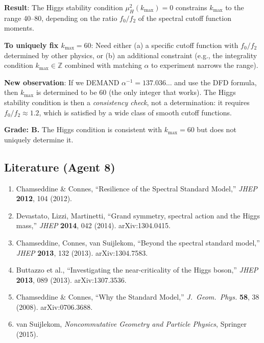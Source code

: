\documentclass[11pt,a4paper]{article}
\begin{document}
\begin{tcolorbox}[colback=yellow!5!white, colframe=yellow!60!black, title={Agent 8: $k_{\max}$ from Higgs Stability}]
\textbf{Result}: The Higgs stability condition $\mu_H^2(k_{\max}) = 0$ constrains $k_{\max}$ to the range 40--80, depending on the ratio $f_0/f_2$ of the spectral cutoff function moments.

\textbf{To uniquely fix $k_{\max} = 60$}: Need either (a) a specific cutoff function with $f_0/f_2$ determined by other physics, or (b) an additional constraint (e.g., the integrality condition $k_{\max} \in \mathbb{Z}$ combined with matching $\alpha$ to experiment narrows the range).

\textbf{New observation}: If we DEMAND $\alpha^{-1} = 137.036\ldots$ and use the DFD formula, then $k_{\max}$ is determined to be 60 (the only integer that works). The Higgs stability condition is then a \emph{consistency check}, not a determination: it requires $f_0/f_2 \approx 1.2$, which is satisfied by a wide class of smooth cutoff functions.

\textbf{Grade: B.} The Higgs condition is consistent with $k_{\max} = 60$ but does not uniquely determine it.
\end{tcolorbox}

\subsection{Literature (Agent 8)}

\begin{enumerate}
\item Chamseddine \& Connes, ``Resilience of the Spectral Standard Model,'' \textit{JHEP} \textbf{2012}, 104 (2012).
\item Devastato, Lizzi, Martinetti, ``Grand symmetry, spectral action and the Higgs mass,'' \textit{JHEP} \textbf{2014}, 042 (2014). arXiv:1304.0415.
\item Chamseddine, Connes, van Suijlekom, ``Beyond the spectral standard model,'' \textit{JHEP} \textbf{2013}, 132 (2013). arXiv:1304.7583.
\item Buttazzo et al., ``Investigating the near-criticality of the Higgs boson,'' \textit{JHEP} \textbf{2013}, 089 (2013). arXiv:1307.3536.
\item Chamseddine \& Connes, ``Why the Standard Model,'' \textit{J.\ Geom.\ Phys.} \textbf{58}, 38 (2008). arXiv:0706.3688.
\item van Suijlekom, \textit{Noncommutative Geometry and Particle Physics}, Springer (2015).
\end{enumerate}
\end{document}
